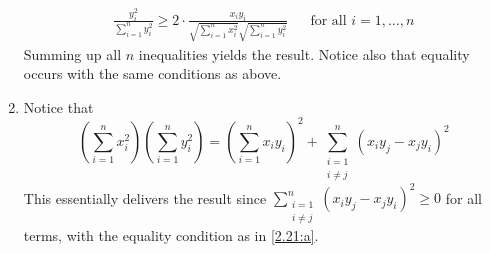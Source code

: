 \begin{solution}
\begin{enumerate}[label=(\alph*)]
\begin{align*}
      \frac{y_i^2}{\sum_{i=1}^n y_i^2} \geq
      2 \cdot \frac{x_i y_i}{\sqrt{\sum_{i=1}^n x_i^2}%
      \sqrt{\sum_{i=1}^n y_i^2}} &&
      \text{for all $i=1,\ldots,n$}
    \end{align*}
    Summing up all $n$ inequalities yields the result.
    Notice also that equality occurs with the same
    conditions as above.
    \item {} Notice that
    \begin{equation*}
      \left(\sum_{i=1}^n x_i^2\right)
      \left(\sum_{i=1}^n y_i^2\right) =
      \left(\sum_{i=1}^n x_i y_i\right)^2 +
      \sum_{\substack{i=1 \\ i\neq j}}^n
      \left(x_i y_j - x_j y_i\right)^2
    \end{equation*}
    This essentially delivers the result since
    $\sum_{\substack{i=1 \\ i\neq j}}^n
    \left(x_i y_j - x_j y_i\right)^2 \geq 0$
    for all terms, with the
    equality condition as in \ref{2.21:a}.
  \end{enumerate}
\end{solution}


